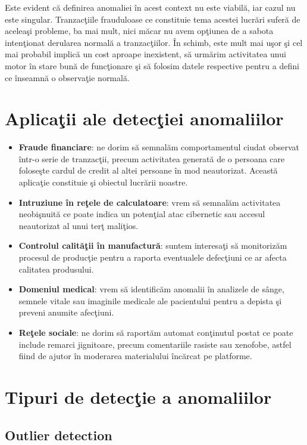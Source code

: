 Este evident că definirea anomaliei în acest context nu este viabilă, iar 
cazul nu este singular. Tranzacţiile frauduloase ce constituie tema acestei lucrări 
suferă de aceleaşi probleme, ba mai mult, nici măcar nu avem opţiunea de a 
sabota intenţionat derularea normală a tranzacţiilor. În schimb, 
este mult mai uşor şi cel mai probabil 
implică un cost aproape inexistent, să urmărim activitatea unui motor 
în stare bună de funcţionare şi să folosim datele respective pentru a 
defini ce înseamnă o observaţie normală.

\section{Aplicaţii ale detecţiei anomaliilor}

\begin{itemize}
    \item \textbf{Fraude financiare}: ne dorim să semnalăm comportamentul ciudat 
    observat într-o serie de tranzacţii, precum activitatea generată de 
    o persoana care foloseşte cardul de credit al altei persoane în mod 
    neautorizat. Această aplicaţie constituie şi obiectul lucrării noastre.
    \item \textbf{Intruziune în reţele de calculatoare}: vrem să semnalăm activitatea
    neobişnuită ce poate indica un potenţial atac cibernetic sau accesul 
    neautorizat al unui terţ maliţios.
    \item \textbf{Controlul calităţii în manufactură}: suntem interesaţi să monitorizăm 
    procesul de producţie pentru a raporta eventualele defecţiuni ce ar afecta 
    calitatea produsului.
    \item \textbf{Domeniul medical}: vrem să identificăm anomalii în analizele de sânge, 
    semnele vitale sau imaginile medicale ale pacientului pentru a depista şi preveni
    anumite afecţiuni.
    \item \textbf{Reţele sociale}: ne dorim să raportăm automat conţinutul postat ce 
    poate include remarci jignitoare, precum comentariile rasiste sau xenofobe,
    astfel fiind de ajutor în moderarea materialului încărcat pe platforme. 
\end{itemize}

\section{Tipuri de detecţie a anomaliilor}

\subsection{Outlier detection}

